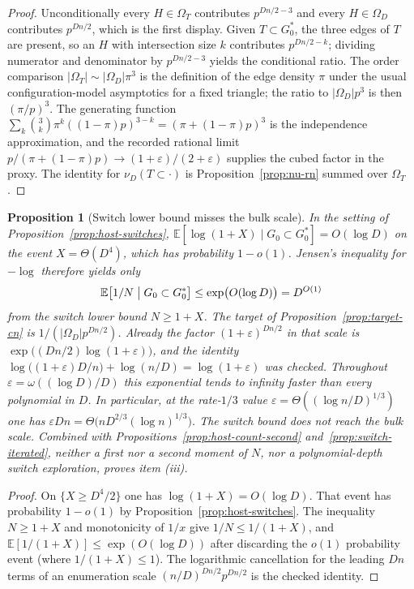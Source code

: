 \documentclass[11pt]{article}
\newtheorem{proposition}[theorem]{Proposition}
\newcommand{\EE}{\mathbb{E}}
\begin{document}
\begin{proof}
Unconditionally every \(H\in\Omega_T\) contributes \(p^{Dn/2-3}\) and every
\(H\in\Omega_D\) contributes \(p^{Dn/2}\), which is the first display.
Given \(T\subset G^*_0\), the three edges of \(T\) are present, so an \(H\) with
intersection size \(k\) contributes \(p^{Dn/2-k}\); dividing numerator and
denominator by \(p^{Dn/2-3}\) yields the conditional ratio.
The order comparison \(\lvert\Omega_T\rvert\sim\lvert\Omega_D\rvert\pi^3\) is the
definition of the edge density \(\pi\) under the usual configuration-model
asymptotics for a fixed triangle; the ratio to \(\lvert\Omega_D\rvert p^3\) is
then \((\pi/p)^3\).
The generating function
\(\sum_k\binom{3}{k}\pi^k((1-\pi)p)^{3-k}=(\pi+(1-\pi)p)^3\) is the
independence approximation, and the recorded rational limit
\(p/(\pi+(1-\pi)p)\to(1+\varepsilon)/(2+\varepsilon)\) supplies the cubed
factor in the proxy.
The identity for \(\nu_D(T\subset\cdot)\) is Proposition~\ref{prop:nu-rn}
summed over \(\Omega_T\).
\end{proof}

\begin{proposition}[Switch lower bound misses the bulk scale]
\label{prop:switch-not-bulk}
In the setting of Proposition~\ref{prop:host-switches},
\(\EE[\log(1+X)\mid G_0\subset G^*_0]=O(\log D)\) on the event
\(X=\Theta(D^4)\), which has probability \(1-o(1)\).
Jensen's inequality for \(-\log\) therefore yields only
\[
\EE\bigl[1/N\bigm|G_0\subset G^*_0\bigr]
\le
\exp\bigl(O(\log D)\bigr)
=
D^{O(1)}
\]
from the switch lower bound \(N\ge 1+X\).
The target of Proposition~\ref{prop:target-cn} is
\(1/(\lvert\Omega_D\rvert p^{Dn/2})\).
Already the factor \((1+\varepsilon)^{Dn/2}\) in that scale is
\(\exp\bigl((Dn/2)\log(1+\varepsilon)\bigr)\), and the identity
\(\log\bigl((1+\varepsilon)D/n\bigr)+\log(n/D)=\log(1+\varepsilon)\)
was checked.
Throughout \(\varepsilon=\omega((\log D)/D)\) this exponential tends to
infinity faster than every polynomial in \(D\).
In particular, at the rate-\(1/3\) value
\(\varepsilon=\Theta((\log n/D)^{1/3})\) one has
\(\varepsilon Dn=\Theta\bigl(n D^{2/3}(\log n)^{1/3}\bigr)\).
The switch bound does not reach the bulk scale.
Combined with Propositions~\ref{prop:host-count-second}
and~\ref{prop:switch-iterated}, neither a first nor a second moment of \(N\),
nor a polynomial-depth switch exploration, proves item (iii).
\end{proposition}

\begin{proof}
On \(\{X\ge D^4/2\}\) one has \(\log(1+X)=O(\log D)\).
That event has probability \(1-o(1)\) by Proposition~\ref{prop:host-switches}.
The inequality \(N\ge 1+X\) and monotonicity of \(1/x\) give
\(1/N\le 1/(1+X)\), and \(\EE[1/(1+X)]\le\exp(O(\log D))\) after discarding
the \(o(1)\) probability event (where \(1/(1+X)\le 1\)).
The logarithmic cancellation for the leading \(Dn\) terms of an enumeration
scale \((n/D)^{Dn/2}p^{Dn/2}\) is the checked identity.
\end{proof}
\end{document}
